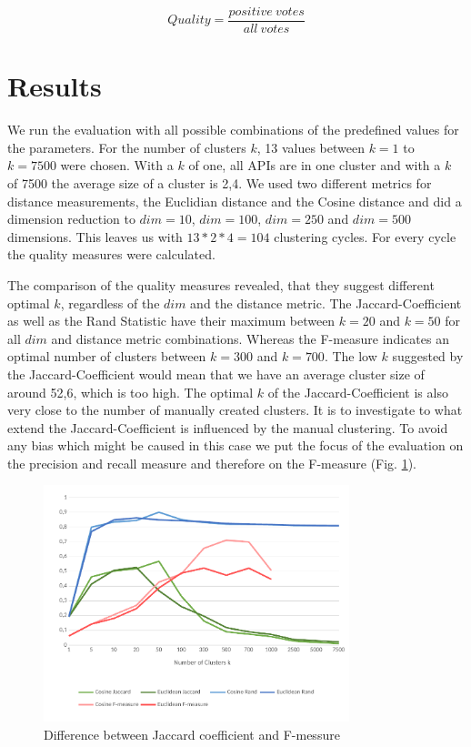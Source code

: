 \documentclass[a4paper]{IEEEtran}
\begin{document}
\begin{equation}
\label{eq:qual}
Quality= \frac{positive~votes}{all~votes}
\end{equation}

\section{Results}
\label{sec:result}
We run the evaluation with all possible combinations of the predefined values for the parameters. For the number of clusters $k$, 13 values between $k=1$ to $k=7500$ were chosen. With a $k$ of one, all APIs are in one cluster and with a $k$ of 7500 the average size of a cluster is 2,4. We used two different metrics for distance measurements, the Euclidian distance and the Cosine distance and did a dimension reduction to $dim⁡= 10$, $dim⁡= 100$, $dim⁡=  250$ and  $dim⁡= 500$ dimensions. This leaves us with $13*2*4=104$ clustering cycles. For every cycle the quality measures were calculated.

The comparison of the quality measures revealed, that they suggest different optimal $k$, regardless of the $dim$ and the distance metric. The Jaccard-Coefficient as well as the Rand Statistic have their maximum between $k=20$ and $k=50$ for all $dim$ and distance metric combinations. Whereas the F-measure indicates an optimal number of clusters between $k=300$ and $k=700$.
The low $k$ suggested by the Jaccard-Coefficient would mean that we have an average cluster size of around 52,6, which is too high. The optimal $k$ of the Jaccard-Coefficient is also very close to the number of manually  created clusters. It is to investigate to what extend the Jaccard-Coefficient is influenced by the manual clustering. To avoid any bias which might be caused in this case we put the focus of the evaluation on the precision and recall measure and therefore on the F-measure (Fig. \ref{fig_sim4}).


\begin{figure}[!t]
\centering
\includegraphics[width= 3.5in]{img/eval.pdf}
\caption{Difference between Jaccard coefficient and F-messure}
\label{fig_sim4}
\end{figure}
\end{document}
